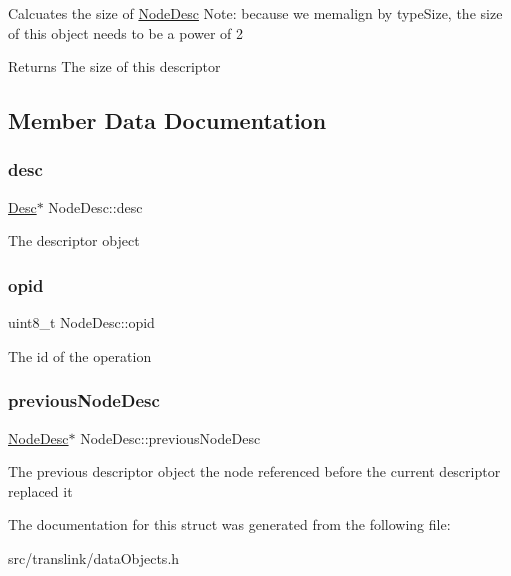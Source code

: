 Calcuates the size of \hyperlink{structNodeDesc}{Node\+Desc} Note\+: because we memalign by type\+Size, the size of this object needs to be a power of 2

\begin{DoxyReturn}{Returns}
The size of this descriptor 
\end{DoxyReturn}


\subsection{Member Data Documentation}
\mbox{\label{structNodeDesc_aa0ed4419141d13e2e5b9302e9233deff}} 
\subsubsection{\texorpdfstring{desc}{desc}}
{\footnotesize\ttfamily \hyperlink{structDesc}{Desc}$\ast$ Node\+Desc\+::desc}

The descriptor object \mbox{\label{structNodeDesc_a7fb5d32e8027ad439d6d096b5031bd89}} 
\subsubsection{\texorpdfstring{opid}{opid}}
{\footnotesize\ttfamily uint8\+\_\+t Node\+Desc\+::opid}

The id of the operation \mbox{\label{structNodeDesc_a834f09c58f10092fb5419ac238a38c4f}} 
\subsubsection{\texorpdfstring{previous\+Node\+Desc}{previousNodeDesc}}
{\footnotesize\ttfamily \hyperlink{structNodeDesc}{Node\+Desc}$\ast$ Node\+Desc\+::previous\+Node\+Desc}

The previous descriptor object the node referenced before the current descriptor replaced it 

The documentation for this struct was generated from the following file\+:\begin{DoxyCompactItemize}
\item 
src/translink/data\+Objects.\+h\end{DoxyCompactItemize}
